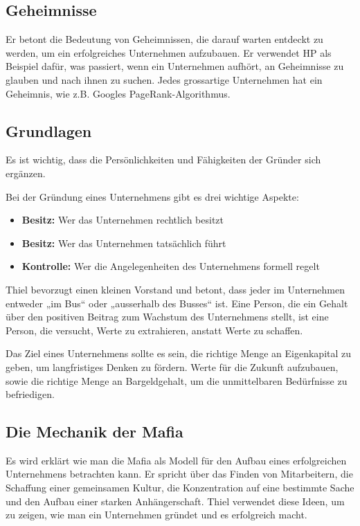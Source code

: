 \documentclass[10pt]{article}
\begin{document}
\subsection{Geheimnisse}

Er betont die Bedeutung von Geheimnissen, die darauf warten entdeckt zu werden, um ein erfolgreiches Unternehmen aufzubauen. Er verwendet HP als Beispiel dafür, was passiert, wenn ein Unternehmen aufhört, an Geheimnisse zu glauben und nach ihnen zu suchen. Jedes grossartige Unternehmen hat ein Geheimnis, wie z.B. Googles PageRank-Algorithmus.

\subsection{Grundlagen}

Es ist wichtig, dass die Persönlichkeiten und Fähigkeiten der Gründer sich ergänzen.

Bei der Gründung eines Unternehmens gibt es drei wichtige Aspekte:

\begin{itemize}
\item \textbf{Besitz:} Wer das Unternehmen rechtlich besitzt
\item \textbf{Besitz:} Wer das Unternehmen tatsächlich führt
\item \textbf{Kontrolle:} Wer die Angelegenheiten des Unternehmens formell regelt
\end{itemize}

Thiel bevorzugt einen kleinen Vorstand und betont, dass jeder im Unternehmen entweder „im Bus“ oder „ausserhalb des Busses“ ist. Eine Person, die ein Gehalt über den positiven Beitrag zum Wachstum des Unternehmens stellt, ist eine Person, die versucht, Werte zu extrahieren, anstatt Werte zu schaffen.

Das Ziel eines Unternehmens sollte es sein, die richtige Menge an Eigenkapital zu geben, um langfristiges Denken zu fördern. Werte für die Zukunft aufzubauen, sowie die richtige Menge an Bargeldgehalt, um die unmittelbaren Bedürfnisse zu befriedigen.

\subsection{Die Mechanik der Mafia}

Es wird erklärt wie man die Mafia als Modell für den Aufbau eines erfolgreichen Unternehmens betrachten kann. Er spricht über das Finden von Mitarbeitern, die Schaffung einer gemeinsamen Kultur, die Konzentration auf eine bestimmte Sache und den Aufbau einer starken Anhängerschaft. Thiel verwendet diese Ideen, um zu zeigen, wie man ein Unternehmen gründet und es erfolgreich macht.
\end{document}
